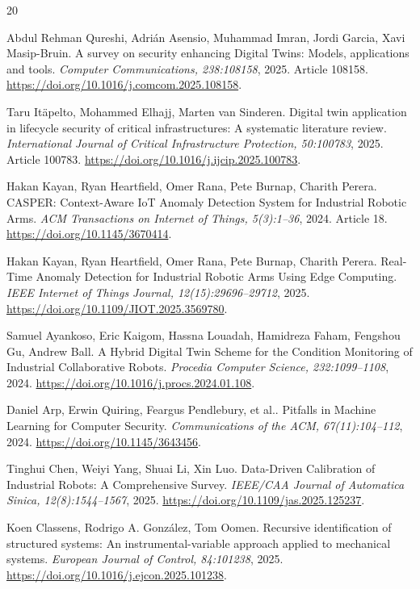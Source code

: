 \begin{thebibliography}{20}

 Abdul Rehman Qureshi, Adrián Asensio, Muhammad Imran, Jordi Garcia, Xavi Masip-Bruin. {A survey on security enhancing Digital Twins: Models, applications and tools}. \emph{Computer Communications, 238:108158}, 2025. Article 108158. \url{https://doi.org/10.1016/j.comcom.2025.108158}.

 Taru Itäpelto, Mohammed Elhajj, Marten van Sinderen. {Digital twin application in lifecycle security of critical infrastructures: A systematic literature review}. \emph{International Journal of Critical Infrastructure Protection, 50:100783}, 2025. Article 100783. \url{https://doi.org/10.1016/j.ijcip.2025.100783}.

 Hakan Kayan, Ryan Heartfield, Omer Rana, Pete Burnap, Charith Perera. {CASPER: Context-Aware IoT Anomaly Detection System for Industrial Robotic Arms}. \emph{ACM Transactions on Internet of Things, 5(3):1--36}, 2024. Article 18. \url{https://doi.org/10.1145/3670414}.

 Hakan Kayan, Ryan Heartfield, Omer Rana, Pete Burnap, Charith Perera. {Real-Time Anomaly Detection for Industrial Robotic Arms Using Edge Computing}. \emph{IEEE Internet of Things Journal, 12(15):29696--29712}, 2025. \url{https://doi.org/10.1109/JIOT.2025.3569780}.

 Samuel Ayankoso, Eric Kaigom, Hassna Louadah, Hamidreza Faham, Fengshou Gu, Andrew Ball. {A Hybrid Digital Twin Scheme for the Condition Monitoring of Industrial Collaborative Robots}. \emph{Procedia Computer Science, 232:1099--1108}, 2024. \url{https://doi.org/10.1016/j.procs.2024.01.108}.

 Daniel Arp, Erwin Quiring, Feargus Pendlebury, et al.. {Pitfalls in Machine Learning for Computer Security}. \emph{Communications of the ACM, 67(11):104--112}, 2024. \url{https://doi.org/10.1145/3643456}.

 Tinghui Chen, Weiyi Yang, Shuai Li, Xin Luo. {Data-Driven Calibration of Industrial Robots: A Comprehensive Survey}. \emph{IEEE/CAA Journal of Automatica Sinica, 12(8):1544--1567}, 2025. \url{https://doi.org/10.1109/jas.2025.125237}.

 Koen Classens, Rodrigo A. Gonz{\'a}lez, Tom Oomen. {Recursive identification of structured systems: An instrumental-variable approach applied to mechanical systems}. \emph{European Journal of Control, 84:101238}, 2025. \url{https://doi.org/10.1016/j.ejcon.2025.101238}.


\end{thebibliography}
